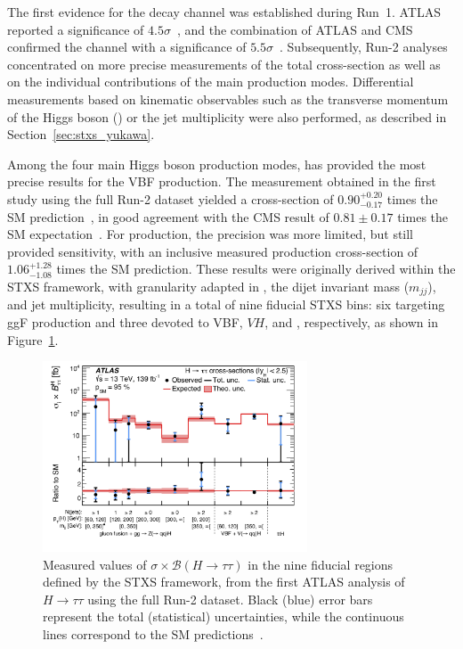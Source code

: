   The first evidence for the \htautau decay channel was established during Run~1. ATLAS reported a significance of $4.5\sigma$~\cite{htau_2015}, and the combination of ATLAS and CMS confirmed the channel with a significance of $5.5\sigma$~\cite{htau_cms_atlas_2016}. Subsequently, Run-2 analyses concentrated on more precise measurements of the total cross-section as well as on the individual contributions of the main production modes. Differential measurements based on kinematic observables such as the transverse momentum of the Higgs boson (\pth) or the jet multiplicity were also performed, as described in Section~\ref{sec:stxs_yukawa}.  
  
  Among the four main Higgs boson production modes, \htautau has provided the most precise results for the VBF production. The measurement obtained in the first study using the full Run-2 dataset yielded a cross-section of $0.90^{+0.20}_{-0.17}$ times the SM prediction~\cite{2022}, in good agreement with the CMS result of $0.81 \pm 0.17$ times the SM expectation~\cite{Tumasyan_2023}. For \ttH production, the precision was more limited, but still provided sensitivity, with an inclusive measured production cross-section of $1.06^{+1.28}_{-1.08}$ times the SM prediction. These results were originally derived within the STXS framework, with granularity adapted in \pth, the dijet invariant mass ($m_{jj}$), and jet multiplicity, resulting in a total of nine fiducial STXS bins: six targeting ggF production and three devoted to VBF, $VH$, and \ttH, respectively, as shown in Figure~\ref{fig:atlas_htautau_stxs}.
  
\begin{figure}[htbp]
    \centering
    \includegraphics[width=0.7\textwidth]{images/pois_9pois.png}
    \caption{Measured values of $\sigma \times \mathcal{B}(H \to \tau\tau)$ in the nine fiducial regions defined by the STXS framework, from the first ATLAS analysis of $H \to \tau\tau$ using the full Run-2 dataset. Black (blue) error bars represent the total (statistical) uncertainties, while the continuous lines correspond to the SM predictions~\cite{2022}.}
    \label{fig:atlas_htautau_stxs}
\end{figure}

